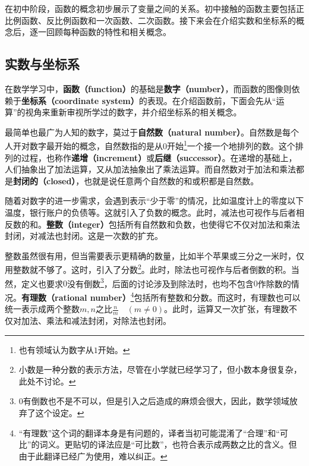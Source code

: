 
\begin{issues}
\issueDraft
\end{issues}

在初中阶段，函数的概念初步展示了变量之间的关系。初中接触的函数主要包括正比例函数、反比例函数和一次函数、二次函数。接下来会在介绍实数和坐标系的概念后，逐一回顾每种函数的特性和相关概念。

\subsection{实数与坐标系}

在数学学习中，\textbf{函数（function）}的基础是\textbf{数字（number）}，而函数的图像则依赖于\textbf{坐标系（coordinate system）}的表现。在介绍函数前，下面会先从“运算”的视角来重新审视所学过的数字，并介绍坐标系的相关概念。

最简单也最广为人知的数字，莫过于\textbf{自然数（natural number）}。自然数是每个人开对数字最开始的概念，自然数指的是从$0$开始\footnote{也有领域认为数字从$1$开始。}一个接一个地排列的数。这个排列的过程，也称作\textbf{递增（increment）}或\textbf{后继（successor）}。在递增的基础上，人们抽象出了加法运算，又从加法抽象出了乘法运算。而自然数对于加法和乘法都是\textbf{封闭的（closed）}，也就是说任意两个自然数的和或积都是自然数。

随着对数字的进一步需求，会遇到表示“少于零”的情况，比如温度计上的零度以下温度，银行账户的负债等。这就引入了负数的概念。此时，减法也可视作与后者相反数的和。\textbf{整数（integer）}包括所有自然数和负数，也使得它不仅对加法和乘法封闭，对减法也封闭。这是一次数的扩充。

整数虽然很有用，但当需要表示更精确的数量，比如半个苹果或三分之一米时，仅用整数就不够了。这时，引入了分数\footnote{小数是一种分数的表示方法，尽管在小学就已经学习了，但小数本身很复杂，此处不讨论。}。此时，除法也可视作与后者倒数的积。当然，定义也要求$0$没有倒数\footnote{$0$有倒数也不是不可以，但是引入之后造成的麻烦会很大，因此，数学领域放弃了这个设定。}，后面的讨论涉及到除法时，也均不包含$0$作除数的情况。\textbf{有理数（rational number）}\footnote{“有理数”这个词的翻译本身是有问题的，译者当初可能混淆了“合理”和“可比”的词义。更贴切的译法应是“可比数”，也符合表示成两数之比的含义。但由于此翻译已经广为使用，难以纠正。}包括所有整数和分数。而这时，有理数也可以统一表示成两个整数$m,n$之比$\displaystyle\frac{n}{m}\quad(m \neq 0)$。此时，运算又一次扩张，有理数不仅对加法、乘法和减法封闭，对除法也封闭。

